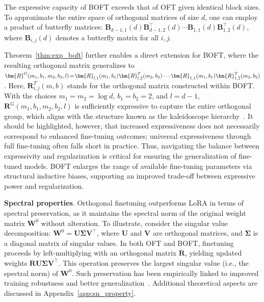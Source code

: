 \begin{theorem}\label{thm:exp_boft}
    The expressive capacity of BOFT exceeds that of OFT given identical block sizes. To approximate the entire space of orthogonal matrices of size $d$, one can employ a product of butterfly matrices: $\bm{B}_{d-1,1}(d)\bm{B}^\top_{d-1,2}(d)\cdots\bm{B}_{1,1}(d)\bm{B}^\top_{1,2}(d)$, where $\bm{B}_{i,j}(d)$ denotes a butterfly matrix for all $i, j$.
\end{theorem}

Theorem~\ref{thm:exp_boft} further enables a direct extension for BOFT, where the resulting orthogonal matrix generalizes to $\thickmuskip=2mu \medmuskip=2mu \bm{R}^G(m_1,b_1,m_2,b_2,l)=\bm{R}_{l,1}(m_1,b_1)\bm{R}_{l,2}^T(m_2,b_2)\cdots\bm{R}_{1,1}(m_1,b_1)\bm{R}_{1,2}^T(m_2,b_2)$. Here, $\bm{R}_{i,j}^T(m,b)$ stands for the orthogonal matrix constructed within BOFT. With the choices $m_1=m_2=\log d$, $b_1=b_2=2$, and $l=d-1$, $\bm{R}^G(m_1,b_1,m_2,b_2,l)$ is sufficiently expressive to capture the entire orthogonal group, which aligns with the structure known as the kaleidoscope hierarchy~\cite{dao2019kaleidoscope}. It should be highlighted, however, that increased expressiveness does not necessarily correspond to enhanced fine-tuning outcomes; universal expressiveness through full fine-tuning often falls short in practice. Thus, navigating the balance between expressivity and regularization is critical for ensuring the generalization of fine-tuned models. BOFT enlarges the range of available fine-tuning parameters via structural inductive biases, supporting an improved trade-off between expressive power and regularization.

\textbf{Spectral properties}. Orthogonal finetuning outperforms LoRA in terms of spectral preservation, as it maintains the spectral norm of the original weight matrix $\bm{W}^0$ without alteration. To illustrate, consider the singular value decomposition: $\bm{W}^0=\bm{U}\bm{\Sigma}\bm{V}^\top$, where $\bm{U}$ and $\bm{V}$ are orthogonal matrices, and $\bm{\Sigma}$ is a diagonal matrix of singular values. In both OFT and BOFT, finetuning proceeds by left-multiplying with an orthogonal matrix $\bm{R}$, yielding updated weights $\bm{R}\bm{U}\bm{\Sigma}\bm{V}^\top$. This operation preserves the largest singular value (i.e., the spectral norm) of $\bm{W}^0$. Such preservation has been empirically linked to improved training robustness and better generalization~\cite{miyato2018spectral,yoshida2017spectral}. Additional theoretical aspects are discussed in Appendix~\ref{app:sn_property}.

